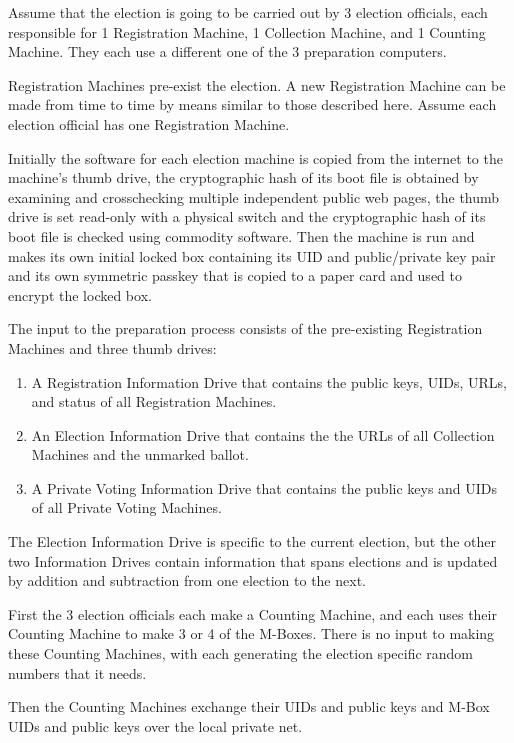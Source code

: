 \documentclass[12pt]{article}
\begin{document}
Assume that the election is going to be carried out by 3 election
officials, each responsible for 1 Registration Machine, 1 Collection
Machine, and 1 Counting Machine.  They each use a different one of
the 3 preparation computers.

Registration Machines pre-exist the election.
A new Registration Machine can be made from time to time
by means similar to those described here.  Assume each election
official has one Registration Machine.

Initially the software for each election machine
is copied from the internet to the machine's thumb drive,
the cryptographic hash of its boot file is obtained by examining
and crosschecking multiple independent public web pages, the thumb
drive is set read-only with a physical switch and the cryptographic
hash of its boot file is checked using commodity software.
Then the machine is run and makes its own initial locked box
containing its UID and public/private key pair and its own
symmetric passkey that is copied to a paper card and used to
encrypt the locked box.

The input to the preparation process consists of the pre-existing
Registration Machines and three thumb drives:
\begin{enumerate}
\item A Registration Information Drive that contains the
public keys, UIDs, URLs, and status of all Registration
Machines.
\item An Election Information Drive that contains the
the URLs of all Collection Machines and the unmarked ballot.
\item A Private Voting Information Drive that contains the
public keys and UIDs of all Private Voting Machines.
\end{enumerate}
The Election Information Drive is specific to the current election,
but the other two Information Drives contain information that
spans elections and is updated by addition and subtraction
from one election to the next.

First the 3 election officials each make a Counting Machine, and
each uses their Counting Machine to make 3 or 4 of the M-Boxes.  There
is no input to making these Counting Machines, with
each generating the election specific random numbers that it needs.

Then the Counting Machines exchange their UIDs and public keys and M-Box
UIDs and public keys over the local private net.
\end{document}
